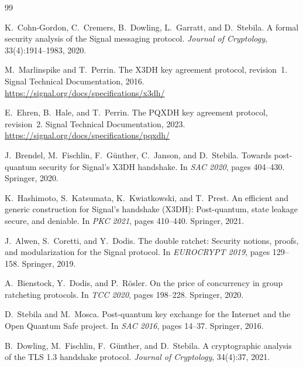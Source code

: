 \documentclass[11pt,a4paper]{article}
\theoremstyle{definition}
\begin{document}

\begin{thebibliography}{99}

K.~Cohn-Gordon, C.~Cremers, B.~Dowling, L.~Garratt, and D.~Stebila.
\newblock A formal security analysis of the Signal messaging protocol.
\newblock \emph{Journal of Cryptology}, 33(4):1914--1983, 2020.

M.~Marlinspike and T.~Perrin.
\newblock The {X3DH} key agreement protocol, revision~1.
\newblock Signal Technical Documentation, 2016.
\newblock \url{https://signal.org/docs/specifications/x3dh/}

E.~Ehren, B.~Hale, and T.~Perrin.
\newblock The {PQXDH} key agreement protocol, revision~2.
\newblock Signal Technical Documentation, 2023.
\newblock \url{https://signal.org/docs/specifications/pqxdh/}

J.~Brendel, M.~Fischlin, F.~G{\"u}nther, C.~Janson, and D.~Stebila.
\newblock Towards post-quantum security for Signal's {X3DH} handshake.
\newblock In \emph{SAC 2020}, pages 404--430. Springer, 2020.

K.~Hashimoto, S.~Katsumata, K.~Kwiatkowski, and T.~Prest.
\newblock An efficient and generic construction for Signal's handshake (X3DH): Post-quantum, state leakage secure, and deniable.
\newblock In \emph{PKC 2021}, pages 410--440. Springer, 2021.

J.~Alwen, S.~Coretti, and Y.~Dodis.
\newblock The double ratchet: Security notions, proofs, and modularization for the Signal protocol.
\newblock In \emph{EUROCRYPT 2019}, pages 129--158. Springer, 2019.

A.~Bienstock, Y.~Dodis, and P.~Rösler.
\newblock On the price of concurrency in group ratcheting protocols.
\newblock In \emph{TCC 2020}, pages 198--228. Springer, 2020.

D.~Stebila and M.~Mosca.
\newblock Post-quantum key exchange for the Internet and the Open Quantum Safe project.
\newblock In \emph{SAC 2016}, pages 14--37. Springer, 2016.

B.~Dowling, M.~Fischlin, F.~G{\"u}nther, and D.~Stebila.
\newblock A cryptographic analysis of the {TLS} 1.3 handshake protocol.
\newblock \emph{Journal of Cryptology}, 34(4):37, 2021.


\end{thebibliography}
\end{document}
